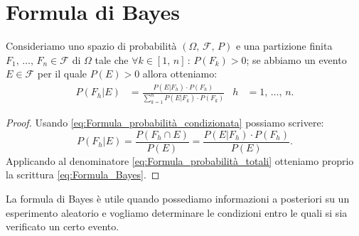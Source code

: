     \section{Formula di Bayes}
        \begin{defn}\label{defn:Formula_Bayes}
            Consideriamo uno spazio di probabilità $(\Omega,\,\mathscr{F},\,P)$ e una partizione finita $F_1,\,\ldots,\,F_n \in \mathscr{F}$ di $\Omega$ tale che $\forall k \in [1,\,n] \,:\, P(F_k) > 0$; se abbiamo un evento $E \in \mathscr{F}$ per il quale $P(E) > 0$ allora otteniamo:
            \begin{align}\label{eq:Formula_Bayes}
                P(F_h|E) &= \frac{P(E|F_h) \cdot P(F_h)}{\sum_{k=1}^{n} P(E|F_k) \cdot P(F_k)} & h &= 1,\,\ldots,\,n
            .
            \end{align}
        \end{defn}
        \begin{proof}
            Usando \eqref{eq:Formula_probabilità_condizionata} possiamo scrivere: \[
                P(F_h|E) = \frac{P(F_h \cap E)}{P(E)} = \frac{P(E|F_h) \cdot P(F_h)}{P(E)}
            .\] 
            Applicando al denominatore \eqref{eq:Formula_probabilità_totali} otteniamo proprio la scrittura \eqref{eq:Formula_Bayes}.
        \end{proof}
        \begin{obsv}
            La formula di Bayes è utile quando possediamo informazioni a posteriori su un esperimento aleatorio e vogliamo determinare le condizioni entro le quali si sia verificato un certo evento.
        \end{obsv}
